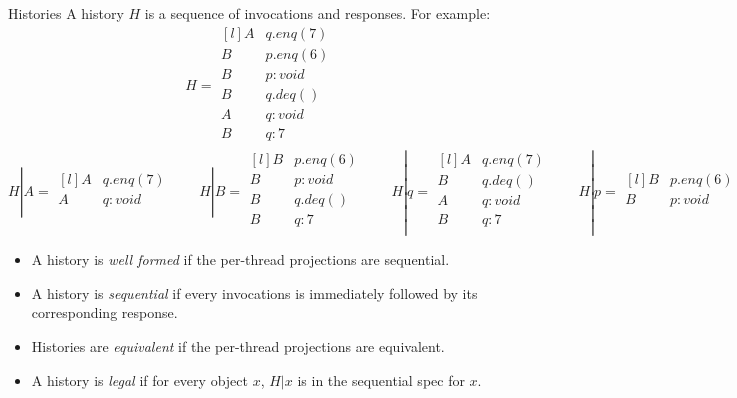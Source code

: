 \begin{definitionbox}{Histories}
    A history $H$ is a sequence of invocations and responses. For example:
    \[H = \begin{matrix*}[l]
        A & q.enq(7) \\
        B & p.enq(6) \\
        B & p : void \\
        B & q.deq() \\
        A & q: void \\
        B & q: 7 \\
    \end{matrix*}\]
    \[H|A = \begin{matrix*}[l]
        A & q.enq(7) \\
        A & q: void \\
    \end{matrix*} \qquad H|B = \begin{matrix*}[l]
        B & p.enq(6) \\
        B & p : void \\
        B & q.deq() \\
        B & q: 7 \\
    \end{matrix*} \qquad
    H|q = \begin{matrix*}[l]
        A & q.enq(7) \\
        B & q.deq() \\
        A & q: void \\
        B & q: 7 \\
    \end{matrix*} \qquad H|p = \begin{matrix*}[l]
        B & p.enq(6) \\
        B & p : void \\
    \end{matrix*}
    \]
    \begin{itemize}
        \item A history is \textit{well formed} if the per-thread projections are sequential.
        \item A history is \textit{sequential} if every invocations is immediately followed by its corresponding response.
        \item Histories are \textit{equivalent} if the per-thread projections are equivalent.
        \item A history is \textit{legal} if for every object $x$, $H|x$ is in the sequential spec for $x$.
    \end{itemize}
\end{definitionbox}

